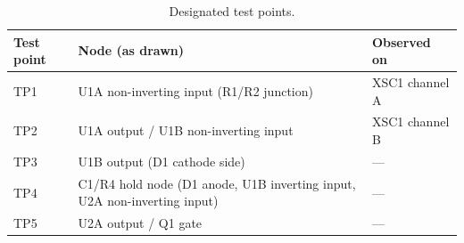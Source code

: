 \begin{table}[!htbp]
\centering
\caption{Designated test points.}
\label{tab:test-points}
\begin{tabularx}{\textwidth}{@{}lXX@{}}
\toprule
\textbf{Test point} & \textbf{Node (as drawn)} & \textbf{Observed on} \\
\midrule
TP1 & U1A non-inverting input (R1/R2 junction) & XSC1 channel A \\
TP2 & U1A output / U1B non-inverting input & XSC1 channel B \\
TP3 & U1B output (D1 cathode side) & --- \\
TP4 & C1/R4 hold node (D1 anode, U1B inverting input, U2A non-inverting input) & --- \\
TP5 & U2A output / Q1 gate & --- \\
\bottomrule
\end{tabularx}
\par\vspace{6pt}
\begin{minipage}{0.96\textwidth}
\raggedright\small {}
\end{minipage}
\end{table}
